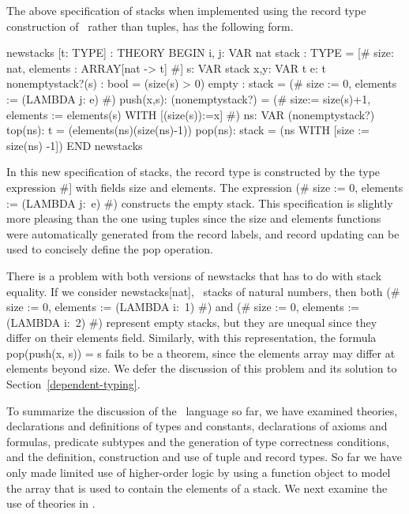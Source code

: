 The above specification of stacks when implemented using the record type
construction of \pvs\ rather than tuples, has the following form.
\begin{pvsex}
  newstacks [t: TYPE] : THEORY 
   BEGIN
    i, j: VAR nat
    stack : TYPE = [\# size: nat, elements : ARRAY[nat -> t] \#]
    s: VAR stack
    x,y: VAR t
    e: t
    nonemptystack?(s) : bool = (size(s) > 0)
    empty : stack = (\# size := 0, elements := (LAMBDA j: e) \#)
    push(x,s): (nonemptystack?) =
       (\# size:= size(s)+1,
          elements := elements(s) WITH [(size(s)):=x] \#)
    ns: VAR (nonemptystack?)
    top(ns): t = (elements(ns)(size(ns)-1))
    pop(ns): stack = (ns WITH [size := size(ns) -1])
   END newstacks 
\end{pvsex}
%
In this new specification of stacks, the record type is constructed by
the type expression {\stt [\# size:\ nat, elements :\ ARRAY[nat -> t] \#]}
with fields {\stt size} and {\stt elements}.  The expression {\stt (\#
size := 0, elements := (LAMBDA j:\ e) \#)} constructs the empty stack.
This specification is slightly more pleasing than the one using tuples
since the {\stt size} and {\stt elements} functions were automatically
generated from the record labels, and record updating can be used to
concisely define the {\stt pop} operation.

There is a problem with both versions of {\stt newstacks}  that
has to do with stack equality.  If we consider {\stt newstacks[nat]},
\ie\ stacks of natural numbers, then both
{\stt (\# size := 0, elements := (LAMBDA i:\ 1) \#)} and
{\stt (\# size := 0, elements := (LAMBDA i:\ 2) \#)} represent
empty stacks, but they are unequal since they differ on
their elements field.  Similarly, with this representation,
the formula {\stt pop(push(x, s)) = s} fails to be a theorem, since the
{\stt elements} array may differ at elements beyond {\stt size}.
We defer the discussion of this problem
and its solution to Section~\ref{dependent-typing}.

To summarize the discussion of the \pvs\ language so far, we have
examined theories, declarations and definitions of types and
constants, declarations of axioms and formulas, predicate subtypes and
the generation of type correctness conditions, and the definition,
construction and use of tuple and record types.  So far we have only
made limited use of higher-order logic by using a function object to
model the array that is used to contain the elements of a stack.  We
next examine the use of theories in \pvs\@.


